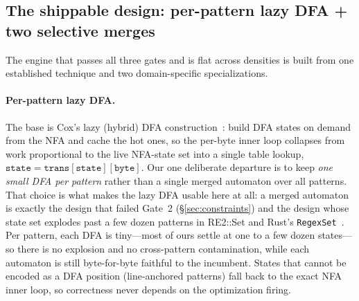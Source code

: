 \documentclass[acmsmall,nonacm,screen]{acmart}
\begin{document}
\subsection{The shippable design: per-pattern lazy DFA + two selective merges}
\label{sec:finding-v19}
The engine that passes all three gates and is flat across densities is built from
one established technique and two domain-specific specializations.

\paragraph{Per-pattern lazy DFA.} The base is Cox's lazy (hybrid) DFA
construction~\cite{cox2007regex}: build DFA states on demand from the NFA and cache
the hot ones, so the per-byte inner loop collapses from work proportional to the
live NFA-state set into a single table lookup, \(\texttt{state} =
\texttt{trans}[\texttt{state}][\texttt{byte}]\). Our one deliberate departure is to
keep \emph{one small DFA per pattern} rather than a single merged automaton over
all patterns. That choice is what makes the lazy DFA usable here at all: a merged
automaton is exactly the design that failed Gate~2 (\S\ref{sec:constraints}) and
the design whose state set explodes past a few dozen patterns in
RE2::Set and Rust's \texttt{RegexSet}~\cite{re2,rustregex}. Per pattern, each DFA is
tiny---most of ours settle at one to a few dozen states---so there is no explosion
and no cross-pattern contamination, while each automaton is still byte-for-byte
faithful to the incumbent. States that cannot be encoded as a DFA position
(line-anchored patterns) fall back to the exact NFA inner loop, so correctness
never depends on the optimization firing.
\end{document}

